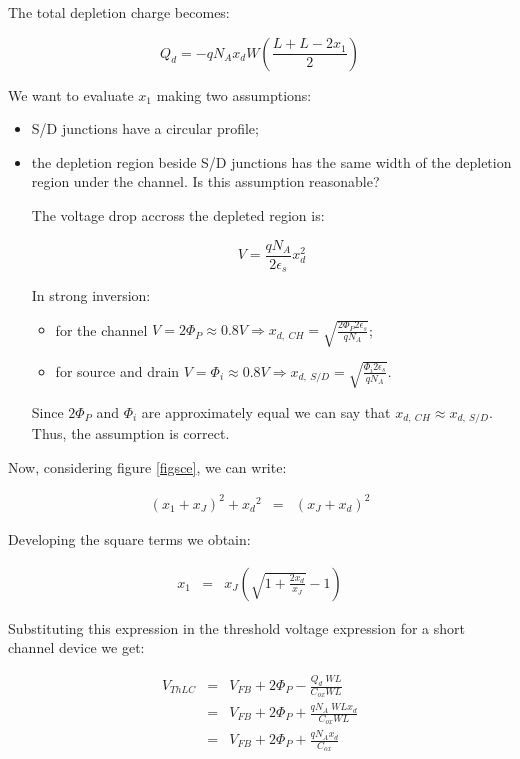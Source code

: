 \documentclass[a4paper, 12pt, twoside, openright]{report}
\begin{document}
The total depletion charge becomes:

\begin{equation}
Q_d = -q N_A x_d W \left( \frac{L + L - 2x_1}{2} \right)
\end{equation}

We want to evaluate $x_{1}$ making two assumptions:

	\begin{itemize}
	\item S/D junctions have a circular profile;
	\item the depletion region beside S/D junctions has the same width of the depletion region under the channel. Is this assumption reasonable?
	
	The voltage drop accross the depleted region is:
	
	\begin{equation}
	V = \frac{q N_A}{2 \epsilon_s} x_d^2
	\end{equation}
	
	In strong inversion:
		\begin{itemize}
		\item for the channel $V = 2\Phi_P \approx 0.8 V \Rightarrow x_{d,\ CH} = \sqrt{\frac{2 \Phi_P 2 \epsilon_s}{q N_A}}$;
		\item for source and drain $V = \Phi_i \approx 0.8 V \Rightarrow x_{d,\ S/D} = \sqrt{\frac{\Phi_i 2 \epsilon_s}{q N_A}}$.
		\end{itemize}
	
	Since $2\Phi_P$ and $\Phi_i$ are approximately equal we can say that $x_{d,\ CH} \approx x_{d,\ S/D}$. Thus, the assumption is correct.
	\end{itemize}

Now, considering figure \ref{figsce}, we can write:

	\begin{eqnarray*}
	 \left(x_1+ x_J\right)^2 + {x_d}^2 &=& \left(x_J+ x_d \right)^2
	\end{eqnarray*}

Developing the square terms we obtain:

	\begin{eqnarray*}
	   x_1&=& x_J \left(\sqrt{1+\frac{2x_d}{x_J}} -1 \right)
	\end{eqnarray*}

Substituting this expression in the threshold voltage expression for a short channel device we get:

	\begin{eqnarray*}
	   V_{ThLC}&=& V_{FB}+2\Phi_P-\frac{Q_d\;WL}{C_{ox}WL}\\
	           &=& V_{FB}+2\Phi_P+\frac{qN_A\;WL x_d}{C_{ox}WL}\\
	           &=& V_{FB}+2\Phi_P+\frac{qN_A x_d}{C_{ox}}
	\end{eqnarray*}
\end{document}
